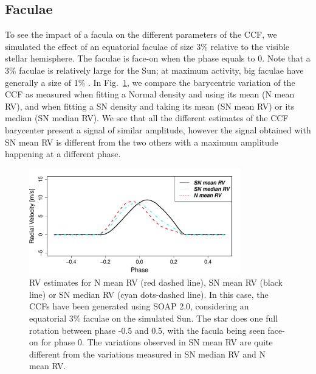 \documentclass{aa}
\newcommand{\jessi}[1]{{\color{Purple}[[\textbf{Jessi: }#1]]}}
\begin{document}
\subsection{Faculae} \label{sec:soap.faculae}

To see the impact of a facula on the different parameters of the CCF, we simulated the effect of an equatorial faculae
of size 3\% relative to the visible stellar hemisphere. The faculae is face-on when the phase equals to 0. Note that a 3\% faculae is relatively large for the Sun; at maximum activity, big faculae have generally a size of 1\% \citep[e.g.][]{Borgniet-2015}. In Fig.~\ref{fig:faculae}, we compare the barycentric variation of the CCF as measured when fitting a Normal density and using its mean (N mean RV), and when fitting a SN density and taking its mean (SN mean RV) or its median (SN median RV). We see that all the different estimates of the CCF barycenter present a signal of similar amplitude, however the signal obtained with SN mean RV is different from the two others with a maximum amplitude happening at a different phase.

\begin{figure}[htbp]
\begin{center}
\includegraphics[width=3.6in]{RV_comparison_FACULAE.pdf} 
\caption{RV estimates for N mean RV (red dashed line),  SN mean RV (black line) or SN median RV (cyan dots-dashed line). In this case, the CCFs have been generated using SOAP 2.0, considering an equatorial 3\% faculae on the simulated Sun. The star does one full rotation between phase -0.5 and 0.5, with the facula being seen face-on for phase $0$. The variations observed in SN mean RV are quite different from the variations measured in SN median RV and N mean RV.  
}
    \label{fig:faculae}
\end{center}
\end{figure}
\end{document}
